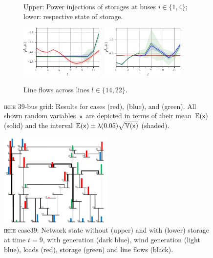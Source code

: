 \documentclass[final,3p,times,twocolumn]{elsarticle}  %
\begin{document}
\begin{figure}
\begin{subfigure}[c]{\figwidth}
		\vspace{-2mm}
		\caption{Upper: Power injections of storages at buses $i \in \{1,4\}$; lower: respective state of storage.}
		\label{fig:Storage}
	\end{subfigure}
	
	\begin{subfigure}[c]{\figwidth}
	\centering
        \includegraphics[width=0.45\textwidth]{figures/time series/case39_volatile/line_914.jpg}~
        \includegraphics[width=0.45\textwidth]{figures/time series/case39_volatile/line_922.jpg}%
        
		\vspace{-2mm}		
		\caption{Line flows across lines $l \in \{14,22\}$.}
		\label{fig:LineFlows}
	\end{subfigure}
	
	\vspace{\adjustlength}
	\caption{\textsc{ieee} 39-bus grid: Results for cases \caseNoStorage (red), \caseStorage (blue), and \caseStorageWithVariance (green). All shown random variables~$\mathsf{x}$ are depicted in terms of their mean~$\mathbb{E}(\mathsf{x})$ (solid) and the interval $\mathbb{E}(\mathsf{x}) \pm \lambda (0.05) \sqrt{\mathbb{V}(\mathsf{x})}$ (shaded).}
	\label{fig:IEEEresults}
	\vspace{3cm}
\end{figure}

\begin{figure}
    \centering
    \includegraphics[width=0.5\textwidth]{figures/case39_grid.jpg}
    \caption{\textsc{ieee} case39: Network state without (upper) and with (lower) storage at time $t=9$, with generation (dark blue), wind generation (light blue), loads (red), storage (green) and line flows (black).}
    \label{fig:case39_grid}
\end{figure}
\end{document}

